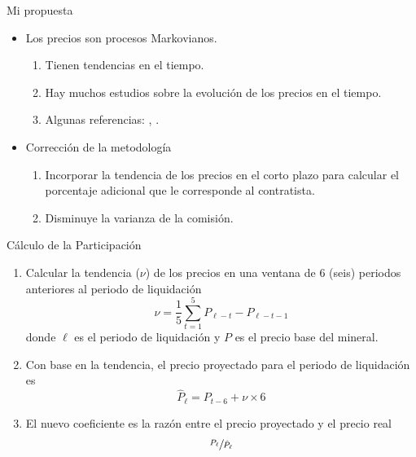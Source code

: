 \documentclass[usenames,dvipsnames]{beamer}
\begin{document}
\begin{frame}{Mi propuesta}
\begin{itemize}
    \item Los precios son procesos Markovianos.
    \begin{enumerate}
        \item Tienen tendencias en el tiempo.
        \item Hay muchos estudios sobre la evolución de los precios en el tiempo. 
        \item Algunas referencias: \citet{Nag20}, \citet{Ryan73}. 
    \end{enumerate}
    \item Corrección de la metodología
    \begin{enumerate}
        \item Incorporar la tendencia de los precios en el corto plazo para calcular el porcentaje adicional que le corresponde al contratista. 
        \item Disminuye la varianza de la comisión. 
    \end{enumerate}
\end{itemize}
\end{frame}

\begin{frame}{Cálculo de la Participación}
    \begin{enumerate}
        \item Calcular la tendencia ($\nu$) de los precios en una ventana de 6 (seis) periodos anteriores al periodo de liquidación
        \begin{equation*}
            \nu = \frac{1}{5}\sum_{t=1}^5 P_{\ell-t}-P_{\ell-t-1}
        \end{equation*}
        donde $\ell$ es el periodo de liquidación y $P$ es el precio base del mineral.  
        \item Con base en la tendencia, el precio proyectado para el periodo de liquidación es
        \begin{equation*}
            \hat{P}_\ell = P_{t-6} + \nu\times6
        \end{equation*}
        \item El nuevo coeficiente es la razón entre el precio proyectado y el precio real
        \begin{equation*}
            \sfrac{P_\ell}{\hat{P}_\ell}
        \end{equation*}
    \end{enumerate}
\end{frame}
\end{document}
